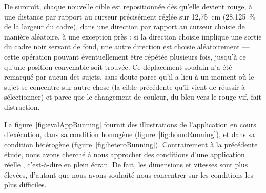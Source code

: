 	De surcroît, chaque nouvelle cible est repositionnée dès qu'elle devient rouge, à une distance par rapport au curseur précisément réglée sur 12,75~cm (28,125~\%{} de la largeur du cadre), dans une direction par rapport au curseur choisie de manière aléatoire, à une exception près : si la direction choisie implique une sortie du cadre noir servant de fond, une autre direction est choisie aléatoirement --- cette opération pouvant éventuellement être répétée plusieurs fois, jusqu'à ce qu'une position convenable soit trouvée. Ce déplacement soudain n'a été remarqué par aucun des sujets, sans doute parce qu'il a lieu à un moment où le sujet se concentre sur autre chose (la cible précédente qu'il vient de réussir à sélectionner) et parce que le changement de couleur, du bleu vers le rouge vif, fait distraction.
	
	La figure~\ref{fig:evalAppRunning} fournit des illustrations de l'application en cours d'exécution, dans sa condition homogène (figure~\ref{fig:homoRunning}), et dans sa condition hétérogène (figure~\ref{fig:heteroRunning}). Contrairement à la précédente étude, nous avons cherché à nous approcher des conditions d'une application \og réelle \fg{}, c'est-à-dire en plein écran. De fait, les dimensions et vitesses sont plus élevées, d'autant que nous avons souhaité nous concentrer sur les conditions les plus difficiles.
	
